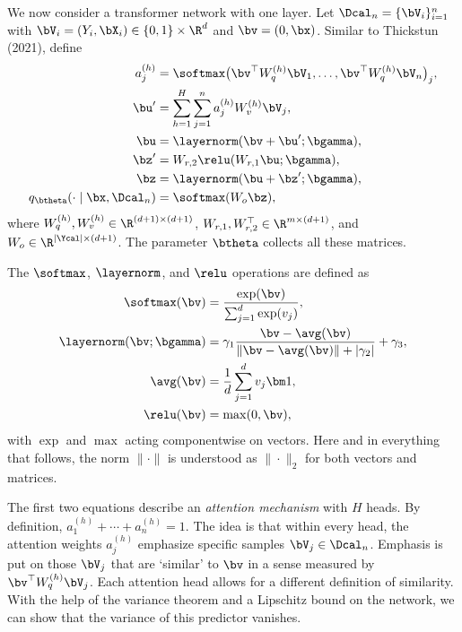 \documentclass[aspectratio=169,10pt]{beamer}
\newcommand{\currentheading}{\ifx\insertsubsection\empty\insertsection\else\insertsubsection\fi}
\begin{document}
\begin{frame}{\currentheading}
\small
We now consider a transformer network with one layer. Let $\Dcal_n = \{\bV_i\}_{i = 1}^n$ with $\bV_i = (Y_i, \bX_i) \in \{0, 1\} \times \R^{d}$ and $\bv = (0, \bx)$. Similar to Thickstun (2021), define
\begin{align*}
	a_{j}^{(h)} & = \softmax \bigl(\bv^\top W_{q}^{(h)} \bV_1, \dots, \bv^\top W_{q}^{(h)}  \bV_{n}\bigr)_j, \\
	\bu' & = \sum_{h = 1}^H \sum_{j = 1}^{n} a_{j}^{(h)} W_{v}^{(h)} \bV_j,                                                             \\
	\bu & =  \layernorm (\bv + \bu'; \bgamma),                                                  \\
	\bz' & =  W_{r, 2} \relu (W_{r, 1} \bu; \bgamma),                                                    \\
	\bz  & =  \layernorm (\bu + \bz'; \bgamma),                                                  \\
	q_{\btheta}(\cdot \mid \bx, \Dcal_n) & = \softmax(W_o \bz),
\end{align*}
where  $W_{q}^{(h)}, W_{v}^{(h)} \in \R^{(d + 1) \times (d + 1)}$, $W_{r, 1}, W_{r, 2}^\top \in \R^{m \times (d + 1)}$, and $ W_{o} \in \R^{|\Ycal| \times (d + 1)}$. The parameter $\btheta$ collects all these matrices.
\end{frame}

\begin{frame}{\currentheading}
The $\softmax$, $\layernorm$, and $\relu$ operations are defined as
\begin{align*}
	\softmax(\bv)            & = \frac{\exp(\bv)}{\sum_{j=1}^d \exp(v_j)} ,  \\
	\layernorm(\bv; \bgamma) & = \gamma_1 \frac{\bv - \avg(\bv)}{\|\bv - \avg(\bv)\| + |\gamma_2|} + \gamma_3 , \\
     \avg(\bv)    &= \frac 1 d \sum_{j = 1}^d v_j  \bm 1,  \\
	\relu(\bv)               & = \max(0, \bv),
\end{align*}
with $\exp$ and $\max$ acting componentwise on vectors. Here and in everything that follows, the norm $\| \cdot \|$ is understood as $\| \cdot \|_2$ for both vectors and matrices.
\end{frame}

\begin{frame}{\currentheading}
The first two equations describe an \emph{attention mechanism} with $H$ heads. By definition, $a_1^{(h)} + \cdots + a_n^{(h)} = 1$. The idea is that within every head, the attention weights $a_j^{(h)}$ emphasize specific samples $\bV_j \in \Dcal_n$. Emphasis is put on those $\bV_j$ that are `similar' to $\bv$ in a sense measured by $\bv^\top W_{q}^{(h)} \bV_j$. Each attention head allows for a different definition of similarity. With the help of the variance theorem and a Lipschitz bound on the network, we can show that the variance of this predictor vanishes.
\end{frame}
\end{document}

